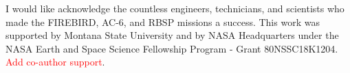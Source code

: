 
I would like acknowledge the countless engineers, technicians, and scientists who made the FIREBIRD, AC-6, and RBSP missions a success. This work was supported by Montana State University and by NASA Headquarters under the NASA Earth and Space Science Fellowship Program - Grant 80NSSC18K1204. \textcolor{red}{Add co-author support}.


